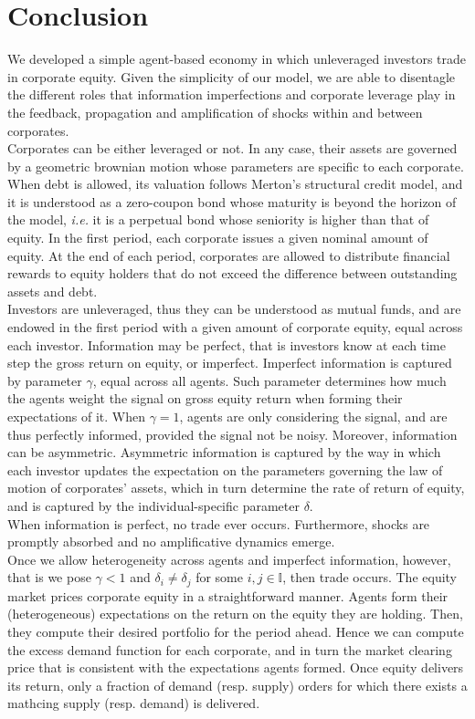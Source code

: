 \documentclass[11pt]{article}
\begin{document}
\section*{Conclusion}
We developed a simple agent-based economy in which unleveraged investors trade in corporate equity. Given the simplicity of our model, we are able to disentagle the different roles that information imperfections and corporate leverage play in the feedback, propagation and amplification of shocks within and between corporates.\\
Corporates can be either leveraged or not. In any case, their assets are governed by a geometric brownian motion whose parameters are specific to each corporate. When debt is allowed, its valuation follows Merton's structural credit model, and it is understood as a zero-coupon bond whose maturity is beyond the horizon of the model, \emph{i.e.} it is a perpetual bond whose seniority is higher than that of equity. In the first period, each corporate issues a given nominal amount of equity. At the end of each period, corporates are allowed to distribute financial rewards to equity holders that do not exceed the difference between outstanding assets and debt.\\
Investors are unleveraged, thus they can be understood as mutual funds, and are endowed in the first period with a given amount of corporate equity, equal across each investor. Information may be perfect, that is investors know at each time step the gross return on equity, or imperfect. Imperfect information is captured by parameter $\gamma$, equal across all agents. Such parameter determines how much the agents weight the signal on gross equity return when forming their expectations of it. When $\gamma = 1$, agents are only considering the signal, and are thus perfectly informed, provided the signal not be noisy. Moreover, information can be asymmetric. Asymmetric information is captured by the way in which each investor updates the expectation on the parameters governing the law of motion of corporates' assets, which in turn determine the rate of return of equity, and is captured by the individual-specific parameter $\delta$.\\
When information is perfect, no trade ever occurs. Furthermore, shocks are promptly absorbed and no amplificative dynamics emerge.\\
Once we allow heterogeneity across agents and imperfect information, however, that is we pose $\gamma < 1$ and $\delta_i \ne \delta_j$ for some $i,j \in \mathbb{I}$, then trade occurs. The equity market prices corporate equity in a straightforward manner. Agents form their (heterogeneous) expectations on the return on the equity they are holding. Then, they compute their desired portfolio for the period ahead. Hence we can compute the excess demand function for each corporate, and in turn the market clearing price that is consistent with the expectations agents formed. Once equity delivers its return, only a fraction of demand (resp. supply) orders for which there exists a mathcing supply (resp. demand) is delivered.\\
\end{document}
